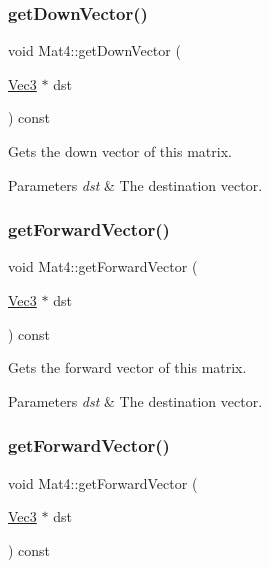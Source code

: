 \subsubsection{\texorpdfstring{get\+Down\+Vector()}{getDownVector()}\hspace{0.1cm}{\footnotesize\ttfamily [2/2]}}
{\footnotesize\ttfamily void Mat4\+::get\+Down\+Vector (\begin{DoxyParamCaption}\item[{\hyperlink{classVec3}{Vec3} $\ast$}]{dst }\end{DoxyParamCaption}) const}

Gets the down vector of this matrix.


\begin{DoxyParams}{Parameters}
{\em dst} & The destination vector. \\
\hline
\end{DoxyParams}
\mbox{\label{classMat4_a1b53f818aab2f341af761e9ca738ab1f}} 
\subsubsection{\texorpdfstring{get\+Forward\+Vector()}{getForwardVector()}\hspace{0.1cm}{\footnotesize\ttfamily [1/2]}}
{\footnotesize\ttfamily void Mat4\+::get\+Forward\+Vector (\begin{DoxyParamCaption}\item[{\hyperlink{classVec3}{Vec3} $\ast$}]{dst }\end{DoxyParamCaption}) const}

Gets the forward vector of this matrix.


\begin{DoxyParams}{Parameters}
{\em dst} & The destination vector. \\
\hline
\end{DoxyParams}
\mbox{\label{classMat4_a1b53f818aab2f341af761e9ca738ab1f}} 
\subsubsection{\texorpdfstring{get\+Forward\+Vector()}{getForwardVector()}\hspace{0.1cm}{\footnotesize\ttfamily [2/2]}}
{\footnotesize\ttfamily void Mat4\+::get\+Forward\+Vector (\begin{DoxyParamCaption}\item[{\hyperlink{classVec3}{Vec3} $\ast$}]{dst }\end{DoxyParamCaption}) const}

